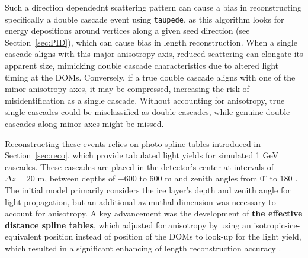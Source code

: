
Such a direction dependednt scattering pattern can cause a bias in reconstructing specifically a double cascade event using \texttt{taupede}, as this algorithm looks for energy depositions around vertices along a given seed direction (see Section~\ref{sec:PID}), which can cause bias in length reconstruction. When a single cascade aligns with this major anisotropy axis, reduced scattering can elongate its apparent size, mimicking double cascade characteristics due to altered light timing at the DOMs. Conversely, if a true double cascade aligns with one of the minor anisotropy axes, it may be compressed, increasing the risk of misidentification as a single cascade. Without accounting for anisotropy, true single cascades could be misclassified as double cascades, while genuine double cascades along minor axes might be missed.

Reconstructing these events relies on photo-spline tables introduced in Section~\ref{sec:reco}, which provide tabulated light yields for simulated 1 GeV cascades. These cascades are placed in the detector's center at intervals of $\Delta z = 20$ m, between depths of $-600$ to $600$ m and zenith angles from $0^{\circ}$ to $180^{\circ}$. The initial model primarily considers the ice layer's depth and zenith angle for light propagation, but an additional azimuthal dimension was necessary to account for anisotropy. A key advancement was the development of \textbf{the effective distance spline tables}, which adjusted for anisotropy by using an isotropic-ice-equivalent position instead of position of the DOMs to look-up for the light yield, which resulted in a  significant enhancing of length reconstruction accuracy .


